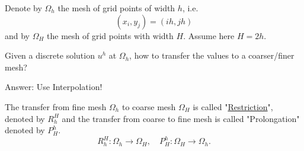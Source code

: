 Denote by $\Omega_{h}$ the mesh of grid points of width $h$, i.e. 
\[
	(x_{i}, y_{j}) = (ih, jh)
\] 
and by $\Omega_{H}$ the mesh of grid points with width $H$. Assume here $H=2h$.



Given a discrete solution $u^{h}$ at $\Omega_{h}$, how to transfer the values to a coarser/finer mesh?

Answer: Use Interpolation!

The transfer from fine mesh $\Omega_{h}$ to coarse mesh $\Omega_{H}$ is called "\underline{Restriction}", denoted by $R_{h}^{H}$ and the transfer from coarse to fine mesh is called "Prolongation" denoted by $P_{H}^{h}$.
\[
R_{h}^{H}: \Omega_{h} \rightarrow \Omega_{H}, \quad
P_{H}^{h}: \Omega_{H} \rightarrow \Omega_{h}
.\] 

